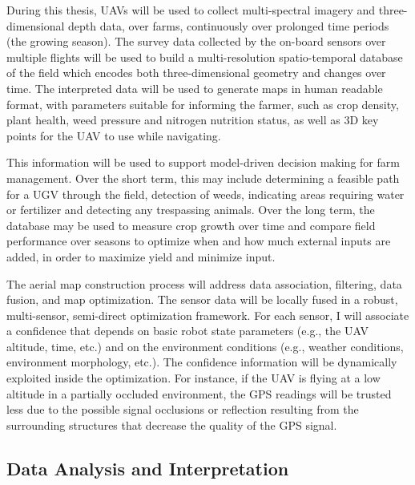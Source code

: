  During this thesis, UAVs will be used to collect multi-spectral imagery and three-dimensional depth data, over farms, continuously over prolonged time periods (the growing season). The survey data collected by the on-board sensors over multiple flights will be used to build a multi-resolution spatio-temporal database of the field which encodes both three-dimensional geometry and changes over time.  The
  interpreted data will be used to generate maps in human readable
  format, with parameters suitable for informing the farmer, such as
  crop density, plant health, weed pressure and nitrogen nutrition
  status, as well as 3D key points for the UAV to use while navigating.

  This information will be used to support model-driven decision
  making for farm management. Over the short term, this may include
  determining a feasible path for a UGV through the field, detection
  of weeds, indicating areas requiring water or fertilizer and
  detecting any trespassing animals. Over the long term, the database
  may be used to measure crop growth over time and compare field
  performance over seasons to optimize when and how much external
  inputs are added, in order to maximize yield and minimize input.

  The aerial map construction process will address data association,
  filtering, data fusion, and map optimization.  The sensor data will
  be locally fused in a robust, multi-sensor, semi-direct optimization
  framework.  For each sensor, I will associate a confidence that
  depends on basic robot state parameters (e.g., the UAV altitude,
  time, etc.) and on the environment conditions (e.g., weather
  conditions, environment morphology, etc.).  The confidence
  information will be dynamically exploited inside the
  optimization. For instance, if the UAV is flying at a low altitude
  in a partially occluded environment, the GPS readings will be
  trusted less due to the possible signal occlusions or reflection
  resulting from the surrounding structures that decrease the quality
  of the GPS signal.



\subsection{Data Analysis and Interpretation}

